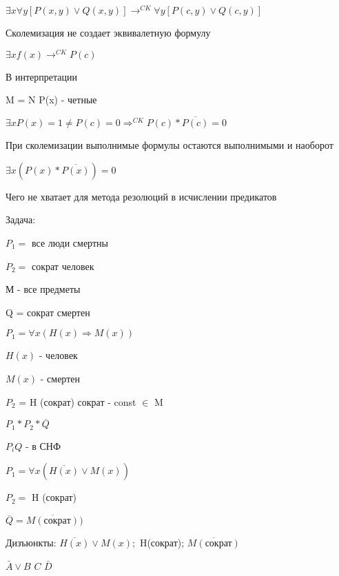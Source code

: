 \documentclass[russian]{lecture-notes}
\begin{document}
    \begin{example}

        $\exists x \forall y [P(x,y) \lor Q(x,y)] \rightarrow^{CK} \forall y [P(c,y) \lor Q(c,y)]$

        \begin{remark}

            Сколемизация не создает эквивалетную формулу

            \end{remark}

        $\exists x f(x) \rightarrow^{CK} P(c)$

        В интерпретации

        M = N \quad P(x) - четные

        $\exists x P(x) = 1 \neq P(c) = 0 \Rightarrow^{CK} P(c) * \overline{P(c)} = 0 $

        \begin{theorem}

        При сколемизации выполнимые формулы остаются выполнимыми и наоборот

        \end{theorem}

    \begin{example}

        $\exists x (P(x) * \overline{P(x)}) = 0 $

        \end{example}


        Чего не хватает для метода резолюций в исчислении предикатов


        Задача:

        $P_{1} = $ все люди смертны

        $P_{2} = $ сократ человек

        М - все предметы

        Q = сократ смертен

        $P_{1} = \forall x (H(x) \Rightarrow M(x))$

        $H(x) $ - человек

        $M(x)$ - смертен

        $P_2$ = H (сократ) \quad \quad сократ - const $\in$ M

        $P_{1} * P_{2} * \overline{Q}$

        $P_{i}Q$ - в СНФ

        $P_{1} = \forall x (\overline{H(x)} \lor M(x))$

        $P_{2} = $ H (сократ)

        $\overline{Q} = \overline{M(сократ)})$

        Дизъюнкты: $\overline{H(x)} \lor M(x);$ H(сократ); $\overline{M(\textrm{сократ})}$

        \qquad \qquad \qquad $\bar{A} \lor B$ \qquad \qquad $C$ \qquad \qquad $\bar{D}$

        \end{example}
\end{document}
